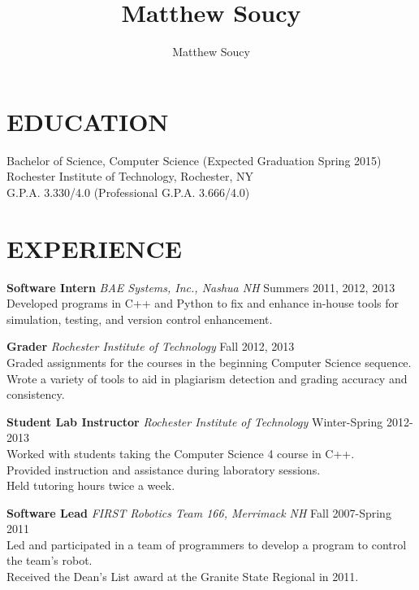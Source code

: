 \documentclass[line]{res}
\author{Matthew Soucy}
\title{Matthew Soucy}
\begin{document}
\setlength{\textheight}{11.5in} %
\address{\large 2433 Nathaniel Rochester Hall\\
		Rochester, NY 14623\\
		(585) 204-7402}
\begin{resume}

\section{EDUCATION}

	Bachelor of Science, Computer Science (Expected Graduation Spring 2015)\\
	Rochester Institute of Technology, Rochester, NY\\
	G.P.A. 3.330/4.0 (Professional G.P.A. 3.666/4.0)

\section{EXPERIENCE}

	\textbf{Software Intern}
	\textit{BAE Systems, Inc., Nashua NH}
	\hfill
	Summers 2011, 2012, 2013\\
	Developed programs in C++ and Python to fix and enhance in-house tools for simulation, testing, and version control enhancement.

	\textbf{Grader}
	\textit{Rochester Institute of Technology}
	\hfill
	Fall 2012, 2013\\
	Graded assignments for the courses in the beginning Computer Science sequence.\\
	Wrote a variety of tools to aid in plagiarism detection and grading accuracy and consistency.

	\textbf{Student Lab Instructor}
	\textit{Rochester Institute of Technology}
	\hfill
	Winter-Spring 2012-2013\\
	Worked with students taking the Computer Science 4 course in C++.\\
	Provided instruction and assistance during laboratory sessions.\\
	Held tutoring hours twice a week.

	\textbf{Software Lead}
	\textit{FIRST Robotics Team 166, Merrimack NH}
	\hfill
	Fall 2007-Spring 2011\\
	Led and participated in a team of programmers to develop a program to control the team's robot.\\
	Received the Dean's List award at the Granite State Regional in 2011.


\end{resume}
\end{document}
